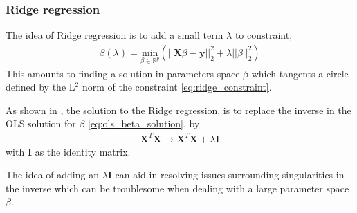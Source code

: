 \documentclass[11pt]{article}
\begin{document}
\subsubsection{Ridge regression}
The idea of Ridge regression is to add a small term $\lambda$ to constraint,
\begin{align}
    \beta(\lambda) = \underset{\beta\in \mathbb{R}^{p}}{\text{min}}(||\bm{X}\beta - \bm{y}||^2_2 + \lambda||\beta||^2_2)
    \label{eq:ridge_constraint}
\end{align}
This amounts to finding a solution in parameters space $\beta$ which tangents a circle defined by the L$^2$ norm of the constraint \eqref{eq:ridge_constraint}.

As shown in \cite{van2015lecture}, the solution to the Ridge regression, is to replace the inverse in the OLS solution for $\beta$ \eqref{eq:ols_beta_solution}, by
\begin{align}
    \bm{X}^T\bm{X} \rightarrow \bm{X}^T\bm{X} + \lambda \bm{I}
    \label{eq:ridge-inverse-replacement}
\end{align}
with $\bm{I}$ as the identity matrix.

The idea of adding an $\lambda\bm{I}$ can aid in resolving issues surrounding singularities in the inverse which can be troublesome when dealing with a large parameter space $\beta$\cite[see notes on regression, p. 17]{morten-regression}.
\end{document}
